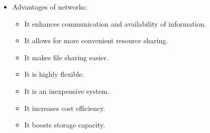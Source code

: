 \begin{itemize}
    \item Advantages of networks:
        \begin{itemize}
            \item It enhances communication and availability of information.
            \item It allows for more convenient resource sharing.
            \item It makes file sharing easier.
            \item It is highly flexible.
            \item It is an inexpensive system.
            \item It increases cost efficiency.
            \item It boosts storage capacity.
        \end{itemize}
\end{itemize}